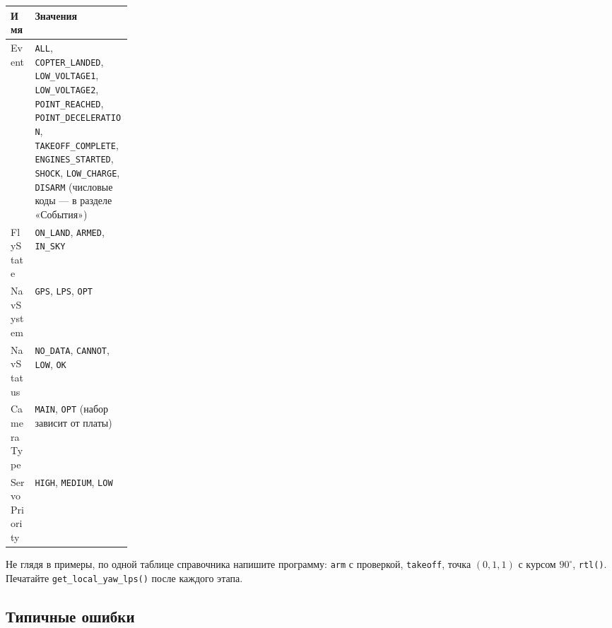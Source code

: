\begin{center}
\footnotesize
\begin{tabularx}{\linewidth}{@{}>{\ttfamily\raggedright\arraybackslash}p{0.2\linewidth} X@{}}
\toprule
\textrm{\textbf{Имя}} & \textbf{Значения} \\
\midrule
Event & \verb|ALL|, \verb|COPTER_LANDED|, \verb|LOW_VOLTAGE1|, \verb|LOW_VOLTAGE2|, \verb|POINT_REACHED|, \verb|POINT_DECELERATION|, \verb|TAKEOFF_COMPLETE|, \verb|ENGINES_STARTED|, \verb|SHOCK|, \verb|LOW_CHARGE|, \verb|DISARM| (числовые коды --- в разделе «События») \\
FlyState & \verb|ON_LAND|, \verb|ARMED|, \verb|IN_SKY| \\
NavSystem & \verb|GPS|, \verb|LPS|, \verb|OPT| \\
NavStatus & \verb|NO_DATA|, \verb|CANNOT|, \verb|LOW|, \verb|OK| \\
CameraType & \verb|MAIN|, \verb|OPT| (набор зависит от платы) \\
ServoPriority & \verb|HIGH|, \verb|MEDIUM|, \verb|LOW| \\
\bottomrule
\end{tabularx}
\end{center}

\begin{taskbox}
Не глядя в примеры, по одной таблице справочника напишите программу: \verb|arm| с проверкой, \verb|takeoff|, точка $(0, 1, 1)$ с курсом $90^\circ$, \verb|rtl()|. Печатайте \verb|get_local_yaw_lps()| после каждого этапа.
\end{taskbox}

\subsection{Типичные ошибки}

